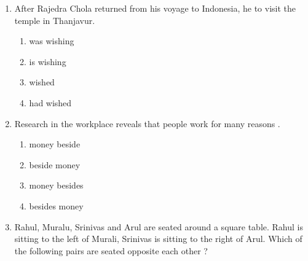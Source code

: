 \documentclass[journal,12pt,onecolumn]{IEEEtran}
\theoremstyle{remark}
\begin{document}
\begin{enumerate}
        \hfill{}
\begin{center}
            \resizebox{0.5\textwidth}{!}{
                
            }
        \end{center}
    \item After Rajedra Chola returned from his voyage to Indonesia, he  to visit
        the temple in Thanjavur.
        \hfill{}
        \begin{multicols}{4}
            \begin{enumerate}
                \item was wishing
                    \columnbreak
                \item is wishing
                    \columnbreak
                \item wished
                    \columnbreak
                \item had wished
            \end{enumerate}
        \end{multicols}
    \item Research in the workplace reveals that people work for many reasons .		
        \hfill{}

        \begin{multicols}{4}
            \begin{enumerate}
                \item money beside
                    \columnbreak
                \item beside money
                    \columnbreak
                \item money besides
                    \columnbreak
                \item besides money
            \end{enumerate}
        \end{multicols}

    \item Rahul, Muralu, Srinivas and Arul are seated around a square table. Rahul is sitting
        to the left of Murali, Srinivas is sitting to the right of Arul. Which of the following
        pairs are seated opposite each other ?
        \hfill{}
        \begin{enumerate}
        \end{enumerate}


\end{enumerate}
\end{document}
